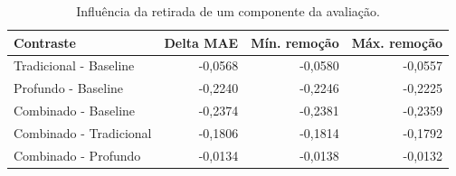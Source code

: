 \begin{table}[!htbp]\centering\small
\caption{Influência da retirada de um componente da avaliação.}
\begin{tabularx}{\linewidth}{Xrrr}
\toprule
Contraste & Delta MAE & Mín. remoção & Máx. remoção \\
\midrule
Tradicional - Baseline & -0,0568 & -0,0580 & -0,0557 \\
Profundo - Baseline & -0,2240 & -0,2246 & -0,2225 \\
Combinado - Baseline & -0,2374 & -0,2381 & -0,2359 \\
Combinado - Tradicional & -0,1806 & -0,1814 & -0,1792 \\
Combinado - Profundo & -0,0134 & -0,0138 & -0,0132 \\
\bottomrule\end{tabularx}
\par{}
\end{table}
